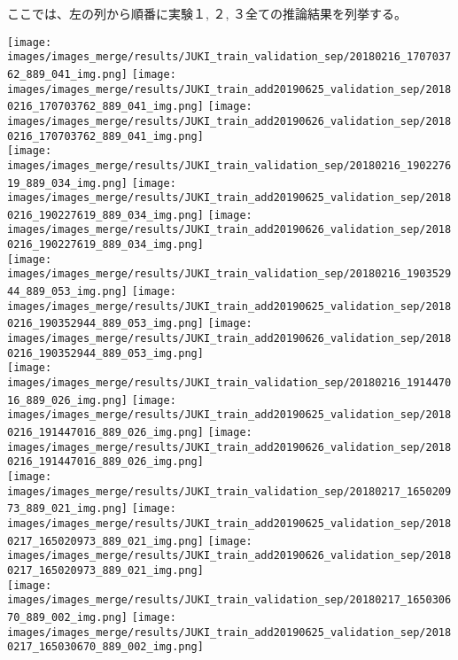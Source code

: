 ここでは、左の列から順番に実験１, ２, ３全ての推論結果を列挙する。

\begin{center}
\noindent
\texttt{[image: images/images\_merge/results/JUKI\_train\_validation\_sep/20180216\_170703762\_889\_041\_img.png]}
\texttt{[image: images/images\_merge/results/JUKI\_train\_add20190625\_validation\_sep/20180216\_170703762\_889\_041\_img.png]}
\texttt{[image: images/images\_merge/results/JUKI\_train\_add20190626\_validation\_sep/20180216\_170703762\_889\_041\_img.png]}\\
\texttt{[image: images/images\_merge/results/JUKI\_train\_validation\_sep/20180216\_190227619\_889\_034\_img.png]}
\texttt{[image: images/images\_merge/results/JUKI\_train\_add20190625\_validation\_sep/20180216\_190227619\_889\_034\_img.png]}
\texttt{[image: images/images\_merge/results/JUKI\_train\_add20190626\_validation\_sep/20180216\_190227619\_889\_034\_img.png]}\\
\texttt{[image: images/images\_merge/results/JUKI\_train\_validation\_sep/20180216\_190352944\_889\_053\_img.png]}
\texttt{[image: images/images\_merge/results/JUKI\_train\_add20190625\_validation\_sep/20180216\_190352944\_889\_053\_img.png]}
\texttt{[image: images/images\_merge/results/JUKI\_train\_add20190626\_validation\_sep/20180216\_190352944\_889\_053\_img.png]}\\
\texttt{[image: images/images\_merge/results/JUKI\_train\_validation\_sep/20180216\_191447016\_889\_026\_img.png]}
\texttt{[image: images/images\_merge/results/JUKI\_train\_add20190625\_validation\_sep/20180216\_191447016\_889\_026\_img.png]}
\texttt{[image: images/images\_merge/results/JUKI\_train\_add20190626\_validation\_sep/20180216\_191447016\_889\_026\_img.png]}\\
\texttt{[image: images/images\_merge/results/JUKI\_train\_validation\_sep/20180217\_165020973\_889\_021\_img.png]}
\texttt{[image: images/images\_merge/results/JUKI\_train\_add20190625\_validation\_sep/20180217\_165020973\_889\_021\_img.png]}
\texttt{[image: images/images\_merge/results/JUKI\_train\_add20190626\_validation\_sep/20180217\_165020973\_889\_021\_img.png]}\\
\texttt{[image: images/images\_merge/results/JUKI\_train\_validation\_sep/20180217\_165030670\_889\_002\_img.png]}
\texttt{[image: images/images\_merge/results/JUKI\_train\_add20190625\_validation\_sep/20180217\_165030670\_889\_002\_img.png]}

\end{center}
